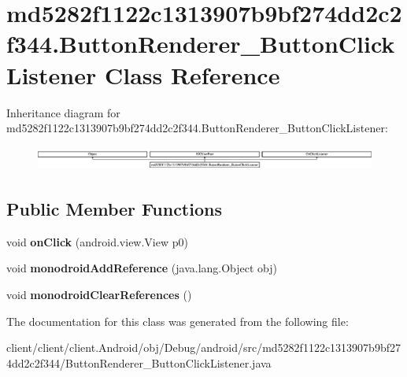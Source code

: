 \hypertarget{classmd5282f1122c1313907b9bf274dd2c2f344_1_1ButtonRenderer__ButtonClickListener}{}\section{md5282f1122c1313907b9bf274dd2c2f344.\+Button\+Renderer\+\_\+\+Button\+Click\+Listener Class Reference}
\label{classmd5282f1122c1313907b9bf274dd2c2f344_1_1ButtonRenderer__ButtonClickListener}
Inheritance diagram for md5282f1122c1313907b9bf274dd2c2f344.\+Button\+Renderer\+\_\+\+Button\+Click\+Listener\+:\begin{figure}[H]
\begin{center}
\leavevmode
\includegraphics[height=0.802867cm]{classmd5282f1122c1313907b9bf274dd2c2f344_1_1ButtonRenderer__ButtonClickListener}
\end{center}
\end{figure}
\subsection*{Public Member Functions}
\begin{DoxyCompactItemize}
\item 
\hypertarget{classmd5282f1122c1313907b9bf274dd2c2f344_1_1ButtonRenderer__ButtonClickListener_a27ea9900c9d0d0854c164c73c6724d5d}{}void {\bfseries on\+Click} (android.\+view.\+View p0)\label{classmd5282f1122c1313907b9bf274dd2c2f344_1_1ButtonRenderer__ButtonClickListener_a27ea9900c9d0d0854c164c73c6724d5d}

\item 
\hypertarget{classmd5282f1122c1313907b9bf274dd2c2f344_1_1ButtonRenderer__ButtonClickListener_a97725f6431dec3de01cb444aa676aa3b}{}void {\bfseries monodroid\+Add\+Reference} (java.\+lang.\+Object obj)\label{classmd5282f1122c1313907b9bf274dd2c2f344_1_1ButtonRenderer__ButtonClickListener_a97725f6431dec3de01cb444aa676aa3b}

\item 
\hypertarget{classmd5282f1122c1313907b9bf274dd2c2f344_1_1ButtonRenderer__ButtonClickListener_a4ae71b56f56cbcefd8dc7a56d3f5a3e8}{}void {\bfseries monodroid\+Clear\+References} ()\label{classmd5282f1122c1313907b9bf274dd2c2f344_1_1ButtonRenderer__ButtonClickListener_a4ae71b56f56cbcefd8dc7a56d3f5a3e8}

\end{DoxyCompactItemize}


The documentation for this class was generated from the following file\+:\begin{DoxyCompactItemize}
\item 
client/client/client.\+Android/obj/\+Debug/android/src/md5282f1122c1313907b9bf274dd2c2f344/Button\+Renderer\+\_\+\+Button\+Click\+Listener.\+java\end{DoxyCompactItemize}

